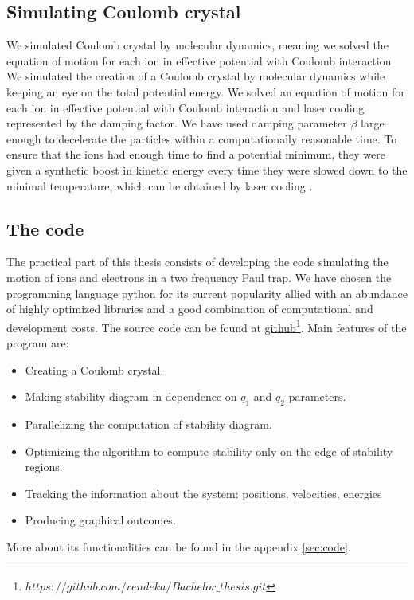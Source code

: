 \subsection{Simulating Coulomb crystal}
We simulated Coulomb crystal by molecular dynamics, meaning we solved the equation of motion for each ion in effective potential with Coulomb interaction. 
We simulated the creation of a Coulomb crystal by molecular dynamics while keeping an eye on the total potential energy. We solved an equation of motion for each ion in effective potential with Coulomb interaction and laser cooling represented by the damping factor. We have used damping parameter $\beta$ large enough to decelerate the particles within a computationally reasonable time. To ensure that the ions had enough time to find a potential minimum, they were given a synthetic boost in kinetic energy every time they were slowed down to the minimal temperature, which can be obtained by laser cooling . 

\subsection{The code}
The practical part of this thesis consists of developing the code simulating the motion of ions and electrons in a two frequency Paul trap. We have chosen the programming language python for its current popularity allied with an abundance of highly optimized libraries and a good combination of computational and development costs. The source code can be found at \href{https://github.com/rendeka/Bachelor_thesis.git}{github\footnote{$https://github.com/rendeka/Bachelor\_thesis.git$}.} Main features of the program are:
\begin{itemize}
	\item Creating a Coulomb crystal.
	\item Making stability diagram in dependence on $q_1$ and $q_2$ parameters.
	\item Parallelizing the computation of stability diagram. 
	\item Optimizing the algorithm to compute stability only on the edge of stability regions.
	\item Tracking the information about the system: positions, velocities, energies
	\item Producing graphical outcomes.
\end{itemize}
More about its functionalities can be found in the appendix \ref{sec:code}.